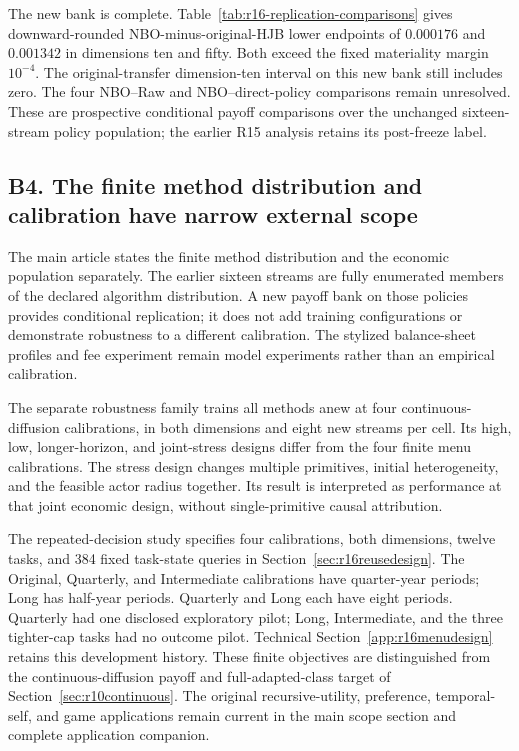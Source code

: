 The new bank is complete. Table~\ref{tab:r16-replication-comparisons} gives downward-rounded NBO-minus-original-HJB lower endpoints of $0.000176$ and $0.001342$ in dimensions ten and fifty. Both exceed the fixed materiality margin $10^{-4}$. The original-transfer dimension-ten interval on this new bank still includes zero. The four NBO--Raw and NBO--direct-policy comparisons remain unresolved. These are prospective conditional payoff comparisons over the unchanged sixteen-stream policy population; the earlier R15 analysis retains its post-freeze label.

\subsection*{B4. The finite method distribution and calibration have narrow external scope}\label{resp:B4}
The main article states the finite method distribution and the economic population separately. The earlier sixteen streams are fully enumerated members of the declared algorithm distribution. A new payoff bank on those policies provides conditional replication; it does not add training configurations or demonstrate robustness to a different calibration. The stylized balance-sheet profiles and fee experiment remain model experiments rather than an empirical calibration.

The separate robustness family trains all methods anew at four continuous-diffusion calibrations, in both dimensions and eight new streams per cell. Its high, low, longer-horizon, and joint-stress designs differ from the four finite menu calibrations. The stress design changes multiple primitives, initial heterogeneity, and the feasible actor radius together. Its result is interpreted as performance at that joint economic design, without single-primitive causal attribution.

The repeated-decision study specifies four calibrations, both dimensions, twelve tasks, and 384 fixed task-state queries in Section~\ref{sec:r16reusedesign}. The Original, Quarterly, and Intermediate calibrations have quarter-year periods; Long has half-year periods. Quarterly and Long each have eight periods. Quarterly had one disclosed exploratory pilot; Long, Intermediate, and the three tighter-cap tasks had no outcome pilot. Technical Section~\ref{app:r16menudesign} retains this development history. These finite objectives are distinguished from the continuous-diffusion payoff and full-adapted-class target of Section~\ref{sec:r10continuous}. The original recursive-utility, preference, temporal-self, and game applications remain current in the main scope section and complete application companion.

